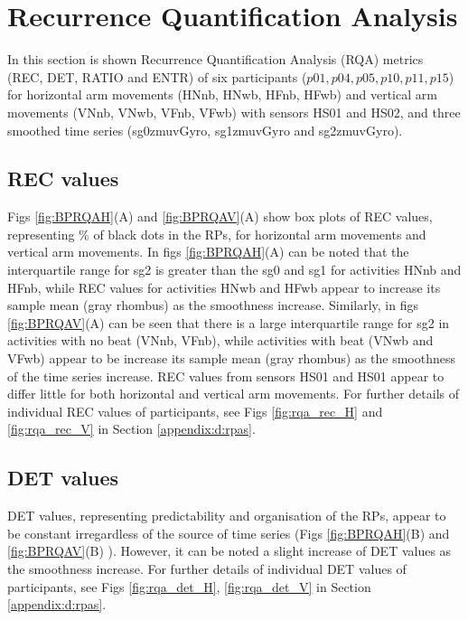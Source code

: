 \newpage
\section{Recurrence Quantification Analysis} \label{ch5:rqas}
In this section is shown Recurrence Quantification Analysis (RQA) metrics 
(REC, DET, RATIO and ENTR) of six participants ($p01, p04, p05, p10, p11, p15$)
for horizontal arm movements (HNnb, HNwb, HFnb, HFwb) 
and vertical arm movements (VNnb, VNwb, VFnb, VFwb)  
with sensors HS01 and HS02, and three smoothed time series 
(sg0zmuvGyro, sg1zmuvGyro and  sg2zmuvGyro).

\subsection*{REC values}
Figs \ref{fig:BPRQAH}(A) and \ref{fig:BPRQAV}(A) 
show box plots of REC values, representing \% of black 
dots in the RPs, for horizontal arm movements and 
vertical arm movements. 
In figs \ref{fig:BPRQAH}(A) can be noted that the interquartile range for sg2 
is greater than the sg0 and sg1 for activities HNnb and HFnb, while
REC values for activities HNwb and HFwb appear to increase 
its sample mean (gray rhombus) as the smoothness increase.
Similarly, in figs \ref{fig:BPRQAV}(A) can be seen that there is a large 
interquartile range for sg2 in activities with no beat (VNnb, VFnb), while
activities with beat (VNwb and VFwb) appear to be increase its sample
mean (gray rhombus) as the smoothness of the time series increase. 
REC values from sensors HS01 and HS01 appear to differ little 
for both horizontal and vertical arm movements. 
For further details of individual REC values of participants, see 
Figs \ref{fig:rqa_rec_H} and \ref{fig:rqa_rec_V} in 
Section \ref{appendix:d:rpas}.


\subsection*{DET values}
DET values, representing predictability and organisation of the RPs, appear
to be constant irregardless of the source of time series 
(Figs \ref{fig:BPRQAH}(B) and \ref{fig:BPRQAV}(B) ).
However, it can be noted a slight increase of DET values as the 
smoothness increase.
For further details of individual DET values of participants, see 
Figs \ref{fig:rqa_det_H}, \ref{fig:rqa_det_V} in
Section \ref{appendix:d:rpas}.


